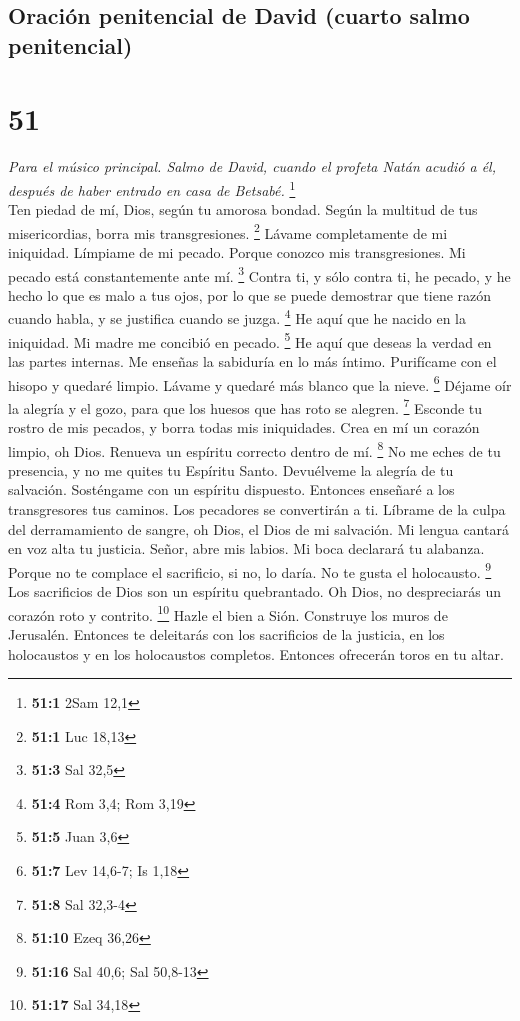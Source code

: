 \begin{paracol}{2}
{\subsection{Oración penitencial de David (cuarto salmo
penitencial)}\label{oraciuxf3n-penitencial-de-david-cuarto-salmo-penitencial}}

\hypertarget{section-100}{%
\section{51}\label{section-100}}

\emph{Para el músico principal. Salmo de David, cuando el profeta Natán
acudió a él, después de haber entrado en casa de Betsabé.} \footnote{\textbf{51:1}
  2Sam 12,1}\\
 Ten piedad de mí, Dios, según tu amorosa bondad. Según la
multitud de tus misericordias, borra mis transgresiones. \footnote{\textbf{51:1}
  Luc 18,13}  Lávame completamente de mi iniquidad.
Límpiame de mi pecado.  Porque conozco mis transgresiones.
Mi pecado está constantemente ante mí. \footnote{\textbf{51:3} Sal 32,5}
 Contra ti, y sólo contra ti, he pecado, y he hecho lo que
es malo a tus ojos, por lo que se puede demostrar que tiene razón cuando
habla, y se justifica cuando se juzga. \footnote{\textbf{51:4} Rom 3,4;
  Rom 3,19}  He aquí que he nacido en la iniquidad. Mi
madre me concibió en pecado. \footnote{\textbf{51:5} Juan 3,6}
 He aquí que deseas la verdad en las partes internas. Me
enseñas la sabiduría en lo más íntimo.  Purifícame con el
hisopo y quedaré limpio. Lávame y quedaré más blanco que la nieve.
\footnote{\textbf{51:7} Lev 14,6-7; Is 1,18}  Déjame oír
la alegría y el gozo, para que los huesos que has roto se alegren.
\footnote{\textbf{51:8} Sal 32,3-4}  Esconde tu rostro de
mis pecados, y borra todas mis iniquidades.  Crea en mí
un corazón limpio, oh Dios. Renueva un espíritu correcto dentro de mí.
\footnote{\textbf{51:10} Ezeq 36,26}  No me eches de tu
presencia, y no me quites tu Espíritu Santo.  Devuélveme
la alegría de tu salvación. Sosténgame con un espíritu dispuesto.
 Entonces enseñaré a los transgresores tus caminos. Los
pecadores se convertirán a ti.  Líbrame de la culpa del
derramamiento de sangre, oh Dios, el Dios de mi salvación. Mi lengua
cantará en voz alta tu justicia.  Señor, abre mis labios.
Mi boca declarará tu alabanza.  Porque no te complace el
sacrificio, si no, lo daría. No te gusta el holocausto. \footnote{\textbf{51:16}
  Sal 40,6; Sal 50,8-13}  Los sacrificios de Dios son un
espíritu quebrantado. Oh Dios, no despreciarás un corazón roto y
contrito. \footnote{\textbf{51:17} Sal 34,18}  Hazle el
bien a Sión. Construye los muros de Jerusalén.  Entonces
te deleitarás con los sacrificios de la justicia, en los holocaustos y
en los holocaustos completos. Entonces ofrecerán toros en tu altar.


\end{paracol}
